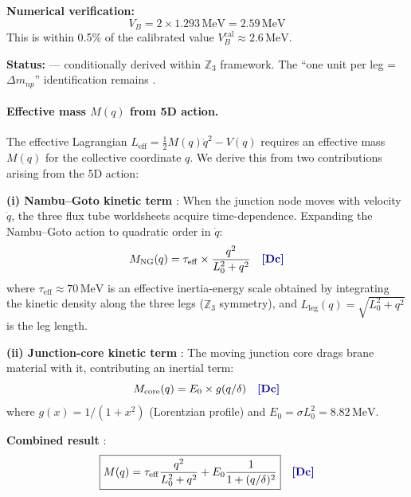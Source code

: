 \textbf{Numerical verification:}
\begin{equation}
V_B = 2 \times 1.293\,\mathrm{MeV} = 2.59\,\mathrm{MeV}
\end{equation}
This is within 0.5\% of the calibrated value $V_B^{\mathrm{cal}} \approx 2.6\,\mathrm{MeV}$.

\textbf{Status:} \tagDc{} --- conditionally derived within $\mathbb{Z}_3$ framework.
The ``one unit per leg = $\Delta m_{np}$'' identification remains \tagI{}.

\paragraph{Effective mass $M(q)$ from 5D action.}
\label{par:Mq_derivation}

The effective Lagrangian $L_{\mathrm{eff}} = \frac{1}{2}M(q)\dot{q}^2 - V(q)$ requires
an effective mass $M(q)$ for the collective coordinate $q$. We derive this from two
contributions arising from the 5D action:

\textbf{(i) Nambu--Goto kinetic term} \tagDc{}:
When the junction node moves with velocity $\dot{q}$, the three flux tube worldsheets
acquire time-dependence. Expanding the Nambu--Goto action to quadratic order in $\dot{q}$:
\begin{equation}
M_{\mathrm{NG}}(q) = \tau_{\mathrm{eff}} \times \frac{q^2}{L_0^2 + q^2}
\quad \text{\tagDc{}}
\label{eq:M_NG}
\end{equation}
where $\tau_{\mathrm{eff}} \approx 70\,\mathrm{MeV}$ is an effective inertia-energy scale
obtained by integrating the kinetic density along the three legs ($\mathbb{Z}_3$ symmetry),
and $L_{\mathrm{leg}}(q) = \sqrt{L_0^2 + q^2}$ is the leg length.

\textbf{(ii) Junction-core kinetic term} \tagDc{}:
The moving junction core drags brane material with it, contributing an inertial term:
\begin{equation}
M_{\mathrm{core}}(q) = E_0 \times g(q/\delta)
\quad \text{\tagDc{}}
\label{eq:M_core}
\end{equation}
where $g(x) = 1/(1+x^2)$ (Lorentzian profile) and $E_0 = \sigma L_0^2 = 8.82\,\mathrm{MeV}$.

\textbf{Combined result} \tagDc{}:
\begin{equation}
\boxed{M(q) = \tau_{\mathrm{eff}} \frac{q^2}{L_0^2 + q^2} + E_0 \frac{1}{1 + (q/\delta)^2}}
\quad \text{\tagDc{}}
\label{eq:M_total}
\end{equation}

